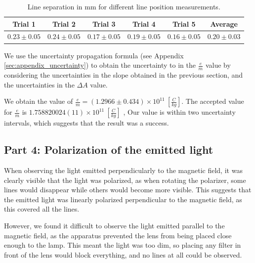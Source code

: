 \def\lineUncertainty{0.05}
\begin{table}[h]
    \centering
    \begin{tabular}{|c|c|c|c|c|c|}
        \hline
        Trial 1                     & Trial 2                     & Trial 3                     & Trial 4                     & Trial 5                     & Average         \\
        \hline
        $0.23 \pm \lineUncertainty$ & $0.24 \pm \lineUncertainty$ & $0.17 \pm \lineUncertainty$ & $0.19 \pm \lineUncertainty$ & $0.16 \pm \lineUncertainty$ & $0.20 \pm 0.03$ \\
        \hline
    \end{tabular}
    \caption{Line separation in mm for different line position measurements.}
    \label{table:line_separation}
\end{table}



We use the uncertainty propagation formula (see Appendix \ref{sec:appendix_uncertainty}) to obtain the uncertainty to in the $\frac{e}{m}$ value by considering the uncertainties in the slope obtained in the previous section, and the uncertainties in the $\Delta A$ value.

We obtain the value of $\frac{e}{m} = (1.2966\pm 0.434) \times 10^{11}~[\frac{C}{kg}]$. The accepted value for $\frac{e}{m}$ is $1.758820024(11) \times 10^{11}~[\frac{C}{kg}]$ \cite{MeasuringIOPSpark}, Our value is within two uncertainty intervals, which suggests that the result was a success.

\subsection{Part 4: Polarization of the emitted light}
When observing the light emitted perpendicularly to the magnetic field, it was clearly visible that the light was polarized, as when rotating the polarizer, some lines would disappear while others would become more visible.
This suggests that the emitted light was linearly polarized perpendicular to the magnetic field, as this covered all the lines.

However, we found it difficult to observe the light emitted parallel to the
magnetic field, as the apparatus prevented the lens from being placed close enough
to the lamp. This meant the light was too dim, so placing any filter in front of the lens would block everything, and no
lines at all could be observed.